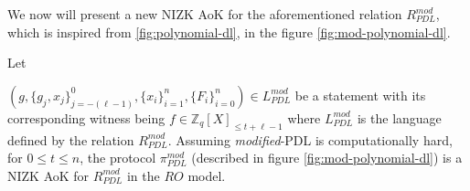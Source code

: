 We now will present a new NIZK AoK for the aforementioned relation $R_{PDL}^{mod}$, which is inspired from \ref{fig:polynomial-dl}, 
in the figure \ref{fig:mod-polynomial-dl}.

\begin{theorem}\label{th:modified_PDL security}
  Let\par $(g,\{g_j,x_j\}_{j=-(\ell-1)}^0,\{x_i\}_{i=1}^n,\{F_i\}_{i=0}^n)\in L_{PDL}^{mod}$ be a statement 
  with its corresponding witness being $f\in\mathbb{Z}_q[X]_{\leq t+\ell-1}$ where $L_{PDL}^{mod}$ is the 
  language defined by the relation $R_{PDL}^{mod}$. Assuming \textit{modified}-PDL is computationally hard, for 
  $0\leq t\leq n$, the protocol $\pi_{PDL}^{mod}$ (described in figure \ref{fig:mod-polynomial-dl}) is a 
  NIZK AoK for $R_{PDL}^{mod}$ in  the $RO$ model.
\end{theorem}
